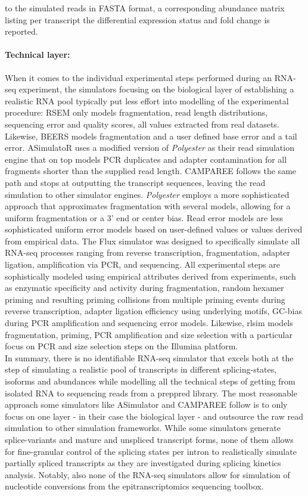 to the simulated reads in FASTA format, a corresponding abundance matrix listing per transcript the differential expression status and fold change is reported.

\paragraph{Technical layer:} When it comes to the individual experimental steps performed during an RNA-seq experiment, the simulators focusing on the biological layer of establishing a realistic RNA pool typically put less effort into modelling of the experimental procedure: RSEM only models fragmentation, read length distributions, sequencing error and quality scores, all values extracted from real datasets. Likewise, BEERS models fragmentation and a user defined base error and a tail error. ASimulatoR uses a modified version of \textit{Polyester} as their read simulation engine that on top models PCR duplicates and adapter contamination for all fragments shorter than the supplied read length. CAMPAREE follows the same path and stops at outputting the transcript sequences, leaving the read simulation to other simulator engines. \textit{Polyester} employs a more sophisticated approach that approximates fragmentation with several models, allowing for a uniform fragmentation or a 3' end or center bias. Read error models are less sophisticated uniform error models based on user-defined values or values derived from empirical data. The Flux simulator was designed to specifically simulate all RNA-seq processes ranging from reverse transcription, fragmentation, adapter ligation, amplification via PCR, and sequencing. All experimental steps are sophistically modeled using empirical attributes derived from experiments, such as enzymatic specificity and activity during fragmentation, random hexamer priming and resulting priming collisions from multiple priming events during reverse transcription, adapter ligation efficiency using underlying motifs, GC-bias during PCR amplification and sequencing error models. Likewise, rlsim  models fragmentation, priming, PCR amplification and size selection with a particular focus on PCR and size selection steps on the Illumina platform.
\\

In summary, there is no identifiable RNA-seq simulator that excels both at the step of simulating a realistic pool of transcripts in different splicing-states, isoforms and abundances while modelling all the technical steps of getting from isolated RNA to sequencing reads from a preppred library. The most reasonable approach some simulators like ASimulator and CAMPAREE follow is to only focus on one layer - in their case the biological layer - and outsource the raw read simulation to other simulation frameworks. While some simulators generate splice-variants and mature and unspliced transcript forms, none of them allows for fine-granular control of the splicing states per intron to realistically simulate partially spliced transcripts as they are investigated during splicing kinetics analysis. Notably, also none of the RNA-seq simulators allow for simulation of nucleotide conversions from the epitranscriptomics sequencing toolbox.

